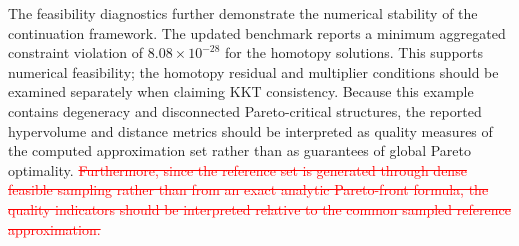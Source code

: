 \documentclass[11pt,pdflatex,sn-mathphys-ay]{sn-jnl}%
\theoremstyle{definition}
\theoremstyle{thmstyleone}%
\theoremstyle{thmstyletwo}%
\theoremstyle{thmstylethree}%
\newcommand{\del}[1]{\textcolor{red}{\sout{#1}}}
\begin{document}
	The feasibility diagnostics further demonstrate the numerical stability of the continuation framework. The updated benchmark reports a minimum aggregated constraint violation of $8.08\times10^{-28}$ for the homotopy solutions. This supports numerical feasibility; the homotopy residual and multiplier conditions should be examined separately when claiming KKT consistency. Because this example contains degeneracy and disconnected Pareto-critical structures, the reported hypervolume and distance metrics should be interpreted as quality measures of the computed approximation set rather than as guarantees of global Pareto optimality. \del{Furthermore, since the reference set is generated through dense feasible sampling rather than from an exact analytic Pareto-front formula, the quality indicators should be interpreted relative to the common sampled reference approximation.}
\end{document}
